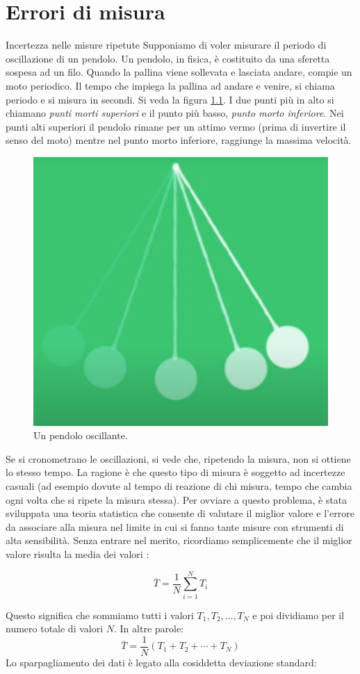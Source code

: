\documentclass[12pt,a4paper,oneside]{book}
\makeatletter
\renewcommand{\section}{\@startsection{section}{1}{\z@}
{-4ex \@plus -1ex \@minus -.4ex}
{1ex \@plus.2ex }
{\normalfont\large\sffamily\bfseries}}
\theoremstyle{esercizio}
\makeatother
\begin{document}
\chapter{Errori di misura}
\section{Incertezza nelle misure ripetute }
Supponiamo di voler misurare il periodo di oscillazione di un pendolo. Un pendolo, in fisica, è costituito da una sferetta sospesa ad un filo. Quando la pallina viene sollevata e lasciata andare, compie un moto periodico. Il tempo che impiega la pallina ad andare e venire, si chiama periodo e si misura in secondi. Si veda la figura \ref{fig:pendolo}. I due punti più in alto si chiamano \textit{punti morti superiori} e il punto più basso, \textit{punto morto inferiore}. Nei punti alti superiori il pendolo rimane per un attimo vermo (prima di invertire il senso del moto) mentre nel punto morto inferiore, raggiunge la massima velocità.

   \begin{figure}[h!]
    \centering
    \includegraphics[width=0.3\linewidth]{img/pendolo.png} 
    \caption{Un pendolo oscillante.}
    \label{fig:pendolo}
\end{figure}  


Se si cronometrano le oscillazioni, si vede che, ripetendo la misura, non si ottiene lo stesso tempo. La ragione è che questo tipo di misura è soggetto ad incertezze casuali (ad esempio dovute al tempo di reazione di chi misura, tempo che cambia ogni volta che si ripete la misura stessa). Per ovviare a questo problema, è stata sviluppata una teoria statistica che consente di valutare il miglior valore e l'errore da associare alla misura nel limite in cui si fanno tante misure con strumenti di alta sensibilità. Senza entrare nel merito, ricordiamo semplicemente che il miglior valore risulta la media dei valori :

\[
\overline{T} = \frac{1}{N} \sum_{i=1}^{N} T_i
\]

\noindent
Questo significa che sommiamo tutti i valori $T_1, T_2, \ldots, T_N$ e poi dividiamo per il numero totale di valori $N$. In altre parole:
\[
\overline{T} = \frac{1}{N} (T_1 + T_2 + \cdots + T_N)
\]
Lo sparpagliamento dei dati  è legato alla cosiddetta deviazione standard:
\end{document}
